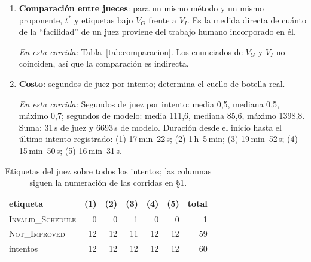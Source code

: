 \documentclass[11pt,a4paper]{article}
\begin{document}
\begin{enumerate}
  \item \textbf{Comparación entre jueces}: para un mismo método y un mismo proponente, $t^*$ y etiquetas bajo $V_G$ frente a $V_I$. Es la medida directa de cuánto de la ``facilidad'' de un juez proviene del trabajo humano incorporado en él.

  \emph{En esta corrida:} Tabla~\ref{tab:comparacion}. Los enunciados de $V_G$ y $V_I$ no coinciden, así que la comparación es indirecta.

  \item \textbf{Costo}: segundos de juez por intento; determina el cuello de botella real.

  \emph{En esta corrida:} Segundos de juez por intento: media 0{,}5, mediana 0{,}5, máximo 0{,}7; segundos de modelo: media 111{,}6, mediana 85{,}6, máximo 1398{,}8. Suma: 31\,s de juez y 6693\,s de modelo. Duración desde el inicio hasta el último intento registrado: (1) 17\,min~22\,s; (2) 1\,h~5\,min; (3) 19\,min~52\,s; (4) 15\,min~50\,s; (5) 16\,min~31\,s.

\end{enumerate}

\begin{table}[!ht]
\centering
\footnotesize
\setlength{\tabcolsep}{4pt}
\begin{tabular}{@{}lrrrrrr@{}}
\toprule
etiqueta & (1) & (2) & (3) & (4) & (5) & total \\
\midrule
\textsc{Invalid\_Schedule} & 0 & 0 & 1 & 0 & 0 & 1 \\
\textsc{Not\_Improved} & 12 & 12 & 11 & 12 & 12 & 59 \\
intentos & 12 & 12 & 12 & 12 & 12 & 60 \\
\bottomrule
\end{tabular}
\caption{Etiquetas del juez sobre todos los intentos; las columnas siguen la numeración de las corridas en §1.}
\label{tab:etiquetas}
\end{table}
\end{document}
